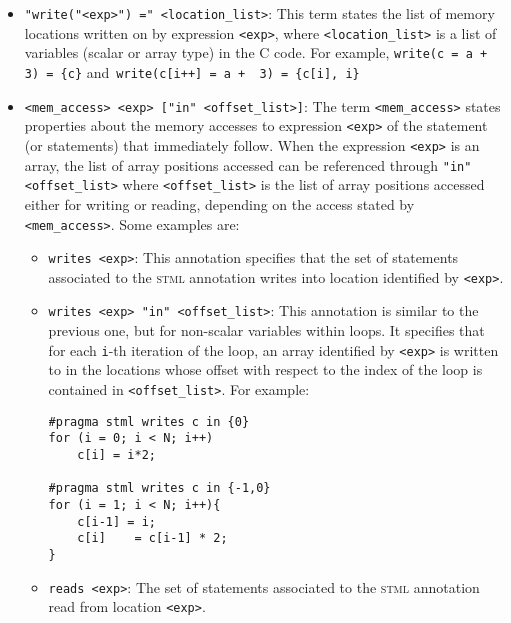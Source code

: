 \documentclass[svgnames,usenames,preprint,nocopyrightspace]{sigplanconf}
\newcommand{\stml}{\textsc{stml}\xspace}
\begin{document}
\begin{itemize}
\item{\lstinline{"write("<exp>") =" <location_list>}}: This term states
  the list of memory locations written on by expression
  \lstinline{<exp>}, where \lstinline{<location_list>} is a list of
  variables (scalar or array type) in the C code. For example,
  \lstinline|write(c = a + 3) = {c}| and~\lstinline|write(c[i++] = a +  3) = {c[i], i}| 

\item{\lstinline{<mem_access> <exp> ["in" <offset_list>]}}: The term
  \lstinline{<mem_access>} states properties about the memory accesses
  to expression \lstinline{<exp>} of the statement (or statements)
  that immediately follow.  When the
  expression \lstinline{<exp>} is an array, the list of array positions
  accessed can be referenced through \lstinline{"in" <offset_list>}
  where \lstinline{<offset_list>} is the list of array positions
  accessed either for writing or reading, depending on the access
  stated by \lstinline{<mem_access>}. Some examples are: 
 
 \begin{itemize}
\item{\lstinline{writes <exp>}}: This annotation specifies that the set
  of statements associated to the \stml
  annotation writes into location identified by \lstinline{<exp>}. 

\item{\lstinline{writes <exp> "in" <offset_list>}}: This annotation is
  similar to the previous one, but for non-scalar variables within
  loops.  It specifies that for each
  \texttt{i}-th iteration of the loop, an array identified by
  \lstinline{<exp>} is written to in the locations whose offset with
  respect to the index of the loop is contained in
  \lstinline{<offset_list>}. For example: 

\noindent
\begin{minipage}{\linewidth}
\begin{lstlisting}[style=cstyle]
#pragma stml writes c in {0}
for (i = 0; i < N; i++)
    c[i] = i*2;
    
#pragma stml writes c in {-1,0}
for (i = 1; i < N; i++){
    c[i-1] = i;
    c[i]    = c[i-1] * 2;    
}        
\end{lstlisting}
\end{minipage}

\item{\lstinline{reads <exp>}}:  The set of statements associated to
  the \stml annotation read from location \lstinline{<exp>}. 


\end{itemize}
\end{itemize}
\end{document}
